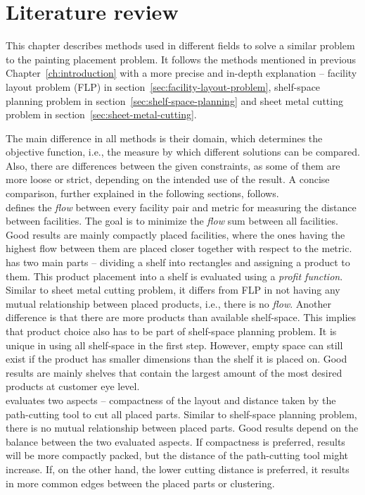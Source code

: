 \chapter{Literature review}\label{ch:literature-review}

This chapter describes methods used in different fields to solve a similar problem to the painting placement problem.
It follows the methods mentioned in previous Chapter~\ref{ch:introduction} with
a more precise and in-depth explanation – facility layout problem (FLP) in section~\ref{sec:facility-layout-problem},
shelf-space planning problem in section~\ref{sec:shelf-space-planning} and sheet metal cutting problem in section~\ref{sec:sheet-metal-cutting}.

The main difference in all methods is their domain, which determines the objective function, i.e.,
the measure by which different solutions can be compared.
Also, there are differences between the given constraints, as some of them are more loose or strict,
depending on the intended use of the result.
A concise comparison, further explained in the following sections, follows.\\

 defines the \textit{flow} between every facility pair and metric for measuring the distance between facilities.
The goal is to minimize the \textit{flow} sum between all facilities.
Good results are mainly compactly placed facilities, where the ones having the
highest flow between them are placed closer together with respect to the metric.\\

 has two main parts – dividing a shelf into rectangles and assigning a product to them.
This product placement into a shelf is evaluated using a \textit{profit function}. Similar to sheet metal cutting problem, it differs from FLP
in not having any mutual relationship between placed products, i.e., there is no \textit{flow}.
Another difference is that there are more products than available shelf-space.
This implies that product choice also has to be part of shelf-space planning problem.
It is unique in using all shelf-space in the first step.
However, empty space can still exist if the product has smaller dimensions than the shelf it is placed on.
Good results are mainly shelves that contain the largest amount of the most desired products at customer eye level.\\

 evaluates two aspects – compactness of the layout and distance taken by the path-cutting tool to cut all placed parts.
Similar to shelf-space planning problem, there is no mutual relationship between placed parts.
Good results depend on the balance between the two evaluated aspects.
If compactness is preferred, results will be more compactly packed, but the distance of the path-cutting tool might increase.
If, on the other hand, the lower cutting distance is preferred, it results in more common edges between the placed parts or clustering.\\







